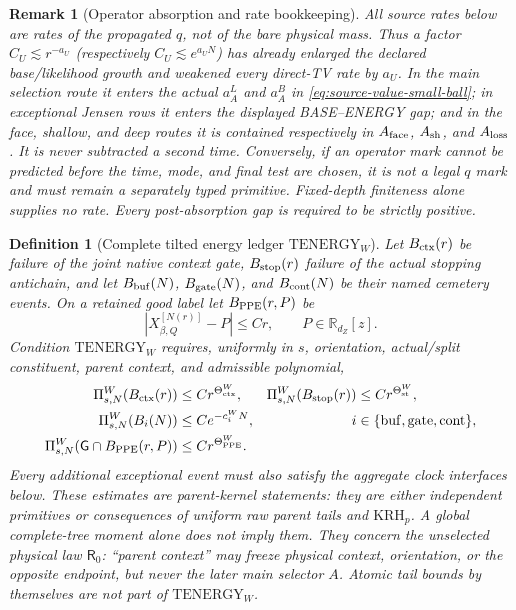 \documentclass[11pt]{article}
\newtheorem{definition}[theorem]{Definition}
\newtheorem{remark}[theorem]{Remark}
\begin{document}
\begin{remark}[Operator absorption and rate bookkeeping]
\label{rem:operator-absorption-rates}
All source rates below are rates of the propagated $q$, not of the bare
physical mass.  Thus a factor $C_U\lesssim r^{-a_U}$ (respectively
$C_U\lesssim e^{a_UN}$) has already enlarged the declared base/likelihood
growth and weakened every direct-TV rate by $a_U$.  In the main selection
route it enters the actual $a_A^L$ and $a_A^B$ in
\eqref{eq:source-value-small-ball}; in exceptional Jensen rows it enters the
displayed BASE--ENERGY gap; and in the face, shallow, and deep routes it is
contained respectively in $A_{\rm face}$, $A_{\rm sh}$, and $A_{\rm loss}$.
It is never subtracted a second time.  Conversely, if an operator mark cannot
be predicted before the time, mode, and final test are chosen, it is not a
legal $q$ mark and must remain a separately typed primitive.  Fixed-depth
finiteness alone supplies no rate.  Every post-absorption gap is required to
be strictly positive.
\end{remark}

\begin{definition}[Complete tilted energy ledger
$\mathrm{TENERGY}_{W}$]
\label{def:tilted-energy-ledger}
Let $B_{\rm ctx}(r)$ be failure of the joint native context gate,
$B_{\rm stop}(r)$ failure of the actual stopping antichain, and let
$B_{\rm buf}(N)$, $B_{\rm gate}(N)$, and $B_{\rm cont}(N)$ be their named
cemetery events.  On a retained good label let $B_{\rm PPE}(r,P)$ be
\[
 |X^{[N(r)]}_{\beta,Q}-P|\le Cr,
 \qquad P\in\mathbb R_{d_Z}[z].
\]
Condition $\mathrm{TENERGY}_{W}$ requires, uniformly in $s$, orientation,
actual/split constituent, parent context, and admissible polynomial,
\begin{align}
 \Pi_{s,N}^{W}(B_{\rm ctx}(r))&\le Cr^{\Theta_{\rm ctx}^{W}},&
 \Pi_{s,N}^{W}(B_{\rm stop}(r))&\le Cr^{\Theta_{\rm st}^{W}},
 \label{eq:tilted-context-stop-tails}\\
 \Pi_{s,N}^{W}(B_i(N))&\le Ce^{-c_i^{W}N},
 &i&\in\{\mathrm{buf},\mathrm{gate},\mathrm{cont}\},
 \label{eq:tilted-auxiliary-tails}\\
 \Pi_{s,N}^{W}(\mathsf G\cap B_{\rm PPE}(r,P))&\le
 Cr^{\Theta_{\rm PPE}^{W}}.
 \label{eq:tilted-PPE-tail}
\end{align}
Every additional exceptional event must also satisfy the aggregate clock
interfaces below.  These estimates are parent-kernel statements: they are
either independent primitives or consequences of uniform raw parent tails
and $\mathrm{KRH}_{p}$.  A global complete-tree moment alone does not imply
them.  They concern the unselected physical law $\mathsf R_0$: ``parent
context'' may freeze physical context, orientation, or the opposite
endpoint, but never the later main selector $A$.  Atomic tail bounds by
themselves are not part of $\mathrm{TENERGY}_{W}$.
\end{definition}
\end{document}
